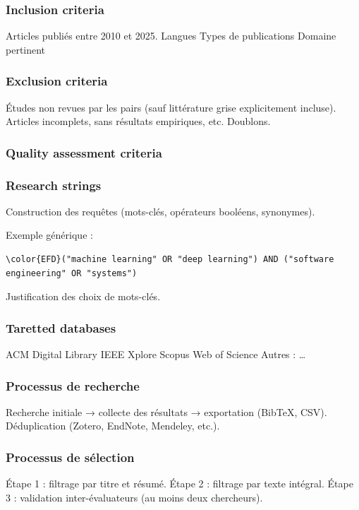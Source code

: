 \documentclass[a4paper,12pt]{article}
\begin{document}
\subsubsection{Inclusion criteria}
\label{sec:org6e36204}
Articles publiés entre 2010 et 2025.
Langues
Types de publications
Domaine pertinent
\subsubsection{Exclusion criteria}
\label{sec:org7854c1c}
Études non revues par les pairs (sauf littérature grise explicitement incluse).
Articles incomplets, sans résultats empiriques, etc.
Doublons.
\subsubsection{Quality assessment criteria}
\label{sec:org246480c}

\subsubsection{Research strings}
\label{sec:orgfee24ee}
Construction des requêtes (mots-clés, opérateurs booléens, synonymes).

Exemple générique :
\begin{Code}
\begin{Verbatim}
\color{EFD}("machine learning" OR "deep learning") AND ("software engineering" OR "systems")
\end{Verbatim}
\end{Code}

Justification des choix de mots-clés.
\subsubsection{Taretted databases}
\label{sec:org5d1332c}
ACM Digital Library
IEEE Xplore
Scopus
Web of Science
Autres : …
\subsubsection{Processus de recherche}
\label{sec:orge622042}
Recherche initiale → collecte des résultats → exportation (BibTeX, CSV).
Déduplication (Zotero, EndNote, Mendeley, etc.).
\subsubsection{Processus de sélection}
\label{sec:org55e16b8}
Étape 1 : filtrage par titre et résumé.
Étape 2 : filtrage par texte intégral.
Étape 3 : validation inter-évaluateurs (au moins deux chercheurs).
\end{document}
